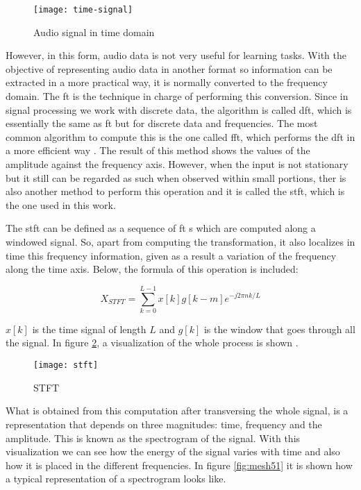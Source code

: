 	\begin{figure}[H]
		\centering
		\captionsetup{justification=centering}
		\texttt{[image: time-signal]}
		\caption{Audio signal in time domain}
		\label{fig:mesh49}
	\end{figure}

	However, in this form, audio data is not very useful for learning tasks. With the objective of representing audio data in another format so information can be extracted in a more practical way, it is normally converted to the frequency domain. The \acrshort{ft} is the technique in charge of performing this conversion. Since in signal processing we work with discrete data, the algorithm is called \acrfull{dft}, which is essentially the same as \acrshort{ft} but for discrete data and frequencies. The most common algorithm to compute this is the one called \acrfull{fft}, which performs the \acrshort{dft} in a more efficient way \cite{Lei2016}. The result of this method shows the values of the amplitude against the frequency axis. However, when the input is not stationary but it still can be regarded as such when observed within small portions, ther is also another method to perform this operation and it is called the \acrfull{stft}, which is the one used in this work.
	
	The \acrshort{stft} can be defined as a sequence of \acrshort{ft} s which are computed along a windowed signal. So, apart from computing the transformation, it also localizes in time this frequency information, given as a result a variation of the frequency along the time axis. Below, the formula of this operation is included:
	
	\[ X_{STFT} =  \sum_{k=0}^{L-1} x[k]g[k-m]e^{-j2\pi n k/L}\]
	
	$x[k]$ is the time signal of length $L$ and $g[k]$ is the window that goes through all the signal. In figure \ref{fig:mesh50}, a visualization of the whole process is shown \cite{Kehtarnavaz2008}.
	
	\begin{figure}[H]
		\centering
		\captionsetup{justification=centering}
		\texttt{[image: stft]}
		\caption{STFT \cite{Gao2006}}
		\label{fig:mesh50}
	\end{figure}

	What is obtained from this computation after transversing the whole  signal, is a representation that depends on three magnitudes: time, frequency and the amplitude. This is known as the spectrogram of the signal. With this visualization we can see how the energy of the signal varies with time and also how it is placed in the different frequencies. In figure \ref{fig:mesh51} it is shown how a typical representation of a spectrogram looks like. 
	
